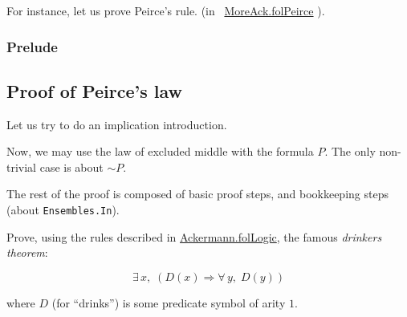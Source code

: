 For instance, let us prove Peirce's rule.
 (in  ~\href{../theories/html/hydras.MoreAck.folPeirce.html}{MoreAck.folPeirce} ).

\subsubsection{Prelude}



\subsection{Proof of Peirce's law}



Let us try to do an implication introduction.


Now, we may use the law of excluded middle with the formula $P$. The only non-trivial case is about $\sim P$.


The rest of the proof is composed of basic proof steps, 
and bookkeeping steps (about \texttt{Ensembles.In}).


\begin{exercise}
Prove, using the rules described in 
 \href{../theories/html/hydras.Ackermann.folLogic.html}{Ackermann.folLogic}, the famous \emph{drinkers theorem}:

$$\exists\,x,\; (D(x)\Longrightarrow \forall\,y,\; D(y))$$
\end{exercise}

where $D$ (for ``drinks'') is some predicate symbol of arity $1$.


